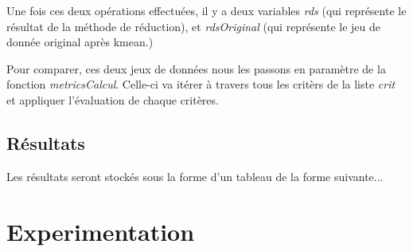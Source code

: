 Une fois ces deux opérations effectuées, il y a deux variables \textit{rds} (qui représente le résultat de la méthode de réduction), et \textit{rdsOriginal} (qui représente le jeu de
donnée original après kmean.)

Pour comparer, ces deux jeux de données nous les passons en paramètre de la fonction \textit{metricsCalcul}.
Celle-ci va itérer à travers tous les critèrs de la liste \textit{crit} et appliquer l'évaluation de chaque critères.

\subsection{Résultats}
Les résultats seront stockés sous la forme d'un tableau de la forme suivante...

\section{Experimentation}
